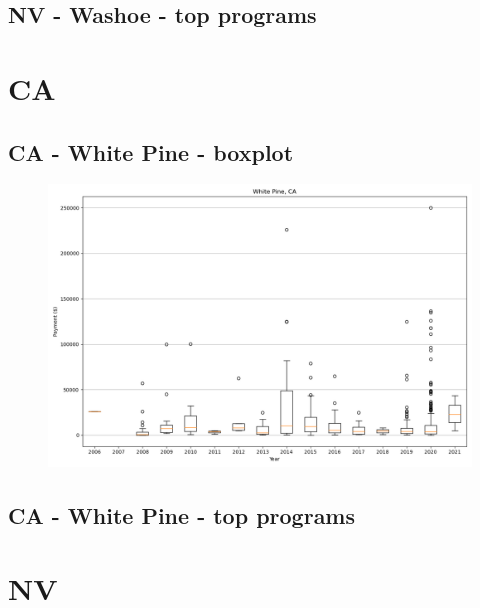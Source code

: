 \subsection*{NV - Washoe - top programs}

\newpage
\section*{CA}
\subsection*{CA - White Pine - boxplot}
\begin{figure}[h]
\centering
\includegraphics[width=7in]{../output/boxplots/counties/White Pine-CA_boxplot.png}
\end{figure}


\subsection*{CA - White Pine - top programs}

\newpage
\section*{NV}
